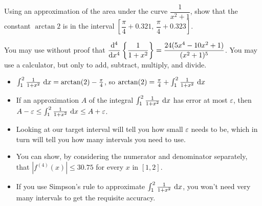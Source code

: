 \begin{question}
Using an approximation of the area under the curve $\dfrac{1}{x^2+1}$, show that the constant $\arctan2$ is in the interval $\left[\dfrac{\pi}{4}+0.321,\, \dfrac{\pi}{4}+0.323\right]$.

You may use without proof that $\displaystyle\frac{\mathrm{d}^4}{\mathrm{d}{x}^4}\left\{\frac{1}{1+x^2}\right\} = \dfrac{24(5x^4-10x^2+1)}{(x^2+1)^5}$. You may use a calculator, but only to add, subtract, multiply, and divide.
\end{question}
\begin{hint}
\begin{itemize}
\item $\int_1^2 \frac{1}{1+x^2}~\mathrm{d}x = \arctan(2) - \frac{\pi}{4}$, so
$\arctan(2) = \frac{\pi}{4}+\int_1^2 \frac{1}{1+x^2}~\mathrm{d}x$
\item If an approximation $A$ of the integral $ \int_1^2 \frac{1}{1+x^2}~\mathrm{d}x$ has error at most $\varepsilon$, then $A-\varepsilon \leq \int_1^2 \frac{1}{1+x^2}~\mathrm{d}x \leq A+\varepsilon$.
\item Looking at our target interval will tell you how small $\varepsilon$ needs to be, which in turn will tell you how many intervals you need to use.
\item You can show, by considering the numerator and denominator separately, that $|f^{(4)}(x)| \leq 30.75$ for every $x$ in $[1,2]$.
\item If you use Simpson's rule to approximate $\int_1^2 \frac{1}{1+x^2}~\mathrm{d}x$, you won't need very many intervals to get the requisite accuracy.
\end{itemize}
\end{hint}
